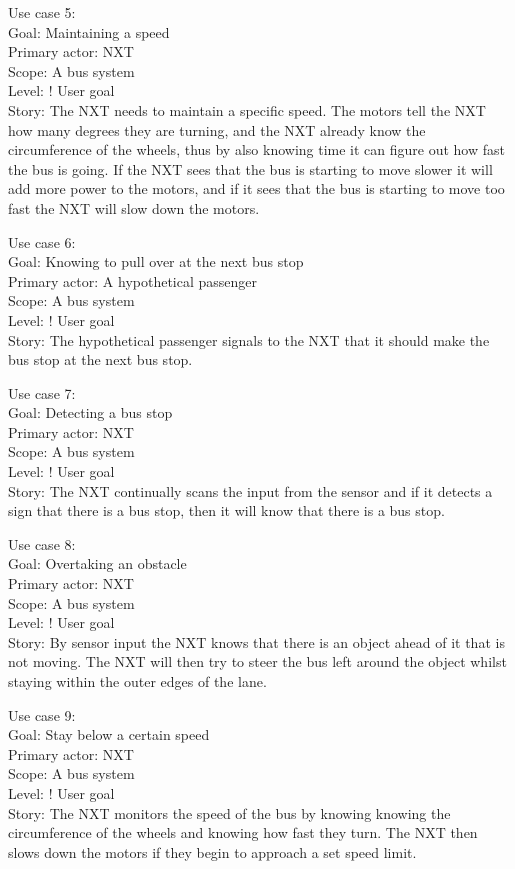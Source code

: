 Use case 5:\\
Goal: Maintaining a speed\\
Primary actor: NXT\\
Scope: A bus system\\
Level: ! User goal\\
Story: The NXT needs to maintain a specific speed. The motors tell the NXT how many degrees they are turning, and the NXT already know the circumference of the wheels, thus by also knowing time it can figure out how fast the bus is going. If the NXT sees that the bus is starting to move slower it will add more power to the motors, and if it sees that the bus is starting to move too fast the NXT will slow down the motors.

Use case 6:\\
Goal: Knowing to pull over at the next bus stop\\
Primary actor: A hypothetical passenger\\
Scope: A bus system\\
Level: ! User goal\\
Story: The hypothetical passenger signals to the NXT that it should make the bus stop at the next bus stop.

Use case 7:\\
Goal: Detecting a bus stop\\
Primary actor: NXT\\
Scope: A bus system\\
Level: ! User goal\\
Story: The NXT continually scans the input from the sensor and if it detects a sign that there is a bus stop, then it will know that there is a bus stop.

Use case 8:\\
Goal: Overtaking an obstacle\\
Primary actor: NXT\\
Scope: A bus system\\
Level: ! User goal\\
Story: By sensor input the NXT knows that there is an object ahead of it that is not moving. The NXT will then try to steer the bus left around the object whilst staying within the outer edges of the lane.

Use case 9:\\
Goal: Stay below a certain speed\\
Primary actor: NXT\\
Scope: A bus system\\
Level: ! User goal\\
Story: The NXT monitors the speed of the bus by knowing knowing the circumference of the wheels and knowing how fast they turn. The NXT then slows down the motors if they begin to approach a set speed limit.

